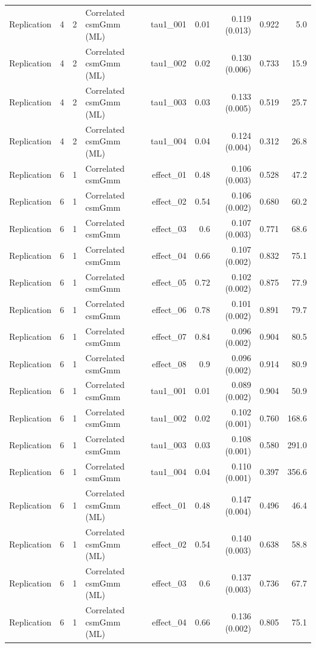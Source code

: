 \begin{longtable}{lcclrrrrr}
Replication & 4 & 2 & Correlated csmGmm (ML) & tau1\_001 & 0.01 & 0.119 (0.013) & 0.922 & 5.0\\
Replication & 4 & 2 & Correlated csmGmm (ML) & tau1\_002 & 0.02 & 0.130 (0.006) & 0.733 & 15.9\\
Replication & 4 & 2 & Correlated csmGmm (ML) & tau1\_003 & 0.03 & 0.133 (0.005) & 0.519 & 25.7\\
Replication & 4 & 2 & Correlated csmGmm (ML) & tau1\_004 & 0.04 & 0.124 (0.004) & 0.312 & 26.8\\
Replication & 6 & 1 & Correlated csmGmm & effect\_01 & 0.48 & 0.106 (0.003) & 0.528 & 47.2\\
Replication & 6 & 1 & Correlated csmGmm & effect\_02 & 0.54 & 0.106 (0.002) & 0.680 & 60.2\\
Replication & 6 & 1 & Correlated csmGmm & effect\_03 & 0.6 & 0.107 (0.003) & 0.771 & 68.6\\
Replication & 6 & 1 & Correlated csmGmm & effect\_04 & 0.66 & 0.107 (0.002) & 0.832 & 75.1\\
Replication & 6 & 1 & Correlated csmGmm & effect\_05 & 0.72 & 0.102 (0.002) & 0.875 & 77.9\\
Replication & 6 & 1 & Correlated csmGmm & effect\_06 & 0.78 & 0.101 (0.002) & 0.891 & 79.7\\
Replication & 6 & 1 & Correlated csmGmm & effect\_07 & 0.84 & 0.096 (0.002) & 0.904 & 80.5\\
Replication & 6 & 1 & Correlated csmGmm & effect\_08 & 0.9 & 0.096 (0.002) & 0.914 & 80.9\\
Replication & 6 & 1 & Correlated csmGmm & tau1\_001 & 0.01 & 0.089 (0.002) & 0.904 & 50.9\\
Replication & 6 & 1 & Correlated csmGmm & tau1\_002 & 0.02 & 0.102 (0.001) & 0.760 & 168.6\\
Replication & 6 & 1 & Correlated csmGmm & tau1\_003 & 0.03 & 0.108 (0.001) & 0.580 & 291.0\\
Replication & 6 & 1 & Correlated csmGmm & tau1\_004 & 0.04 & 0.110 (0.001) & 0.397 & 356.6\\
Replication & 6 & 1 & Correlated csmGmm (ML) & effect\_01 & 0.48 & 0.147 (0.004) & 0.496 & 46.4\\
Replication & 6 & 1 & Correlated csmGmm (ML) & effect\_02 & 0.54 & 0.140 (0.003) & 0.638 & 58.8\\
Replication & 6 & 1 & Correlated csmGmm (ML) & effect\_03 & 0.6 & 0.137 (0.003) & 0.736 & 67.7\\
Replication & 6 & 1 & Correlated csmGmm (ML) & effect\_04 & 0.66 & 0.136 (0.002) & 0.805 & 75.1\\

\end{longtable}
